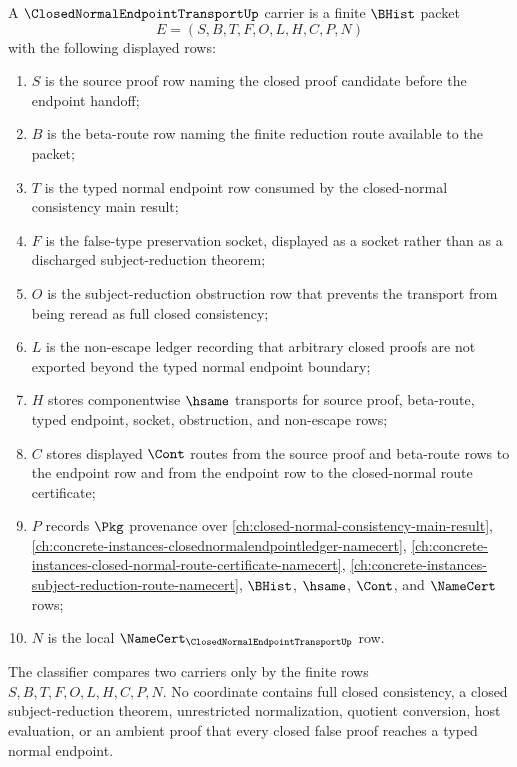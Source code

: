 \begin{definition}
\label{def:closed-normal-endpoint-transport-carrier}
A $\ClosedNormalEndpointTransportUp$ carrier is a finite $\BHist$ packet
$$
E=(S,B,T,F,O,L,H,C,P,N)
$$
with the following displayed rows:
\begin{enumerate}
\item $S$ is the source proof row naming the closed proof candidate before the endpoint handoff;
\item $B$ is the beta-route row naming the finite reduction route available to the packet;
\item $T$ is the typed normal endpoint row consumed by the closed-normal consistency main result;
\item $F$ is the false-type preservation socket, displayed as a socket rather than as a discharged subject-reduction theorem;
\item $O$ is the subject-reduction obstruction row that prevents the transport from being reread as full closed consistency;
\item $L$ is the non-escape ledger recording that arbitrary closed proofs are not exported beyond the typed normal endpoint boundary;
\item $H$ stores componentwise $\hsame$ transports for source proof, beta-route, typed endpoint, socket, obstruction, and non-escape rows;
\item $C$ stores displayed $\Cont$ routes from the source proof and beta-route rows to the endpoint row and from the endpoint row to the closed-normal route certificate;
\item $P$ records $\Pkg$ provenance over \autoref{ch:closed-normal-consistency-main-result}, \autoref{ch:concrete-instances-closednormalendpointledger-namecert}, \autoref{ch:concrete-instances-closed-normal-route-certificate-namecert}, \autoref{ch:concrete-instances-subject-reduction-route-namecert}, $\BHist$, $\hsame$, $\Cont$, and $\NameCert$ rows;
\item $N$ is the local $\NameCert_{\ClosedNormalEndpointTransportUp}$ row.
\end{enumerate}
The classifier compares two carriers only by the finite rows $S,B,T,F,O,L,H,C,P,N$. No coordinate contains full closed consistency, a closed subject-reduction theorem, unrestricted normalization, quotient conversion, host evaluation, or an ambient proof that every closed false proof reaches a typed normal endpoint.
\end{definition}

